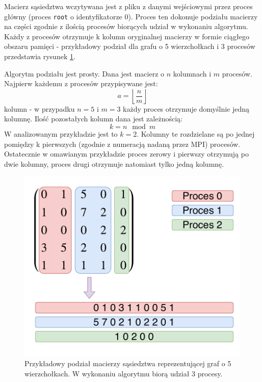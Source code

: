 \documentclass[12pt]{article}
\begin{document}
Macierz sąsiedztwa wczytywana jest z pliku z danymi wejściowymi przez proces główny (proces \lstinline{root} o identyfikatorze 0). Proces ten dokonuje podziału macierzy na części zgodnie z ilością procesów biorących udział w wykonaniu algorytmu. Każdy z procesów otrzymuje k kolumn oryginalnej macierzy w formie ciągłego obszaru pamięci - przykładowy podział dla grafu o 5 wierzchołkach i 3 procesów przedstawia rysunek \ref{fig:am2}.

Algorytm podziału jest prosty. Dana jest macierz o $n$ kolumnach i $m$ procesów. Najpierw każdemu z procesów przypisywane jest:
\begin{equation}
a = \left\lfloor \frac{n}{m} \right\rfloor
\end{equation}
kolumn - w przypadku $n = 5$ i $m = 3$ każdy proces otrzymuje domyślnie jedną kolumnę. Ilość pozostałych kolumn dana jest zależnością:
\begin{equation}
k = n \mod m
\end{equation}
W analizowanym przykładzie jest to $k = 2$. Kolumny te rozdzielane są po jednej pomiędzy k pierwszych (zgodnie z numeracją nadaną przez MPI) procesów. Ostatecznie w omawianym przykładzie proces zerowy i pierwszy otrzymują po dwie kolumny, proces drugi otrzymuje natomiast tylko jedną kolumnę.

\begin{figure}[H]
\centering
\includegraphics[width=\textwidth]{static/MatrixSplit.pdf}
\caption{Przykładowy podział macierzy sąsiedztwa reprezentującej graf o 5 wierzchołkach. W wykonaniu algorytmu biorą udział 3 procesy.}
\label{fig:am2}
\end{figure}
\end{document}
